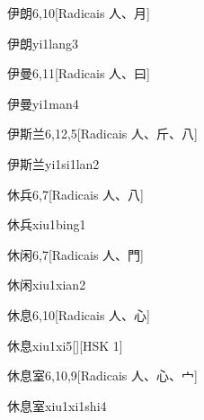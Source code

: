 \begin{entry}{伊朗}{6,10}[Radicais ⼈、⽉]
  \begin{phonetics}{伊朗}{yi1lang3}
  \end{phonetics}
\end{entry}

\begin{entry}{伊曼}{6,11}[Radicais ⼈、⽈]
  \begin{phonetics}{伊曼}{yi1man4}
  \end{phonetics}
\end{entry}

\begin{entry}{伊斯兰}{6,12,5}[Radicais ⼈、⽄、⼋]
  \begin{phonetics}{伊斯兰}{yi1si1lan2}
  \end{phonetics}
\end{entry}

\begin{entry}{休兵}{6,7}[Radicais ⼈、⼋]
  \begin{phonetics}{休兵}{xiu1bing1}
  \end{phonetics}
\end{entry}

\begin{entry}{休闲}{6,7}[Radicais ⼈、⾨]
  \begin{phonetics}{休闲}{xiu1xian2}
  \end{phonetics}
\end{entry}

\begin{entry}{休息}{6,10}[Radicais ⼈、⼼]
  \begin{phonetics}{休息}{xiu1xi5}[][HSK 1]
  \end{phonetics}
\end{entry}

\begin{entry}{休息室}{6,10,9}[Radicais ⼈、⼼、⼧]
  \begin{phonetics}{休息室}{xiu1xi1shi4}
  \end{phonetics}
\end{entry}

